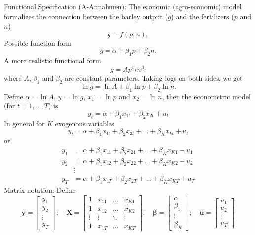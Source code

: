\documentclass{article}
\begin{document}
Functional Specification (A-Annahmen):  
The economic (agro-economic) model formalizes the connection between the barley output ($g$) and the fertilizers ($p$ and $n$)
\[ g=f(p,n), \]
Possible function form
\[ g=\alpha +\beta _{1}p+\beta _{2}n. \]
A more realistic functional form
\[ g=Ap^{\beta _{1}}n^{\beta _{2}} \]
where $A$, $\beta _{1}$ and $\beta _{2}$ are constant parameters. Taking logs on both sides, we get
\[ \ln g=\ln A+\beta _{1}\ln p+\beta _{2}\ln n. \]
Define $\alpha =\ln A$, $y=\ln g$, $x_{1}=\ln p$ and $x_{2}=\ln n$, then the econometric model (for $t=1,\ldots ,T$) is
\[ y_{t}=\alpha +\beta _{1}x_{1t}+\beta _{2}x_{2t}+u_{t} \]
In general for $K$ exogenous variables
\[ y_{t}=\alpha +\beta _{1}x_{1t}+\beta _{2}x_{2t}+\ldots +\beta_{K}x_{kt}+u_{t} \]
or
\begin{align*}
y_{1} &=\alpha +\beta _{1}x_{11}+\beta _{2}x_{21}+...+\beta _{K}x_{K1}+u_{1} \\
y_{2} &=\alpha +\beta _{1}x_{12}+\beta _{2}x_{22}+...+\beta _{K}x_{K2}+u_{2} \\
&\vdots \\
y_{T} &=\alpha +\beta _{1}x_{1T}+\beta _{2}x_{2T}+...+\beta _{K}x_{KT}+u_{T}
\end{align*}
Matrix notation: Define
\begin{equation*}
\mathbf{y}=\left[ 
\begin{array}{l}
y_{1} \\ 
y_{2} \\ 
\vdots \\ 
y_{T}%
\end{array}%
\right] ;\quad \mathbf{X}=\left[ 
\begin{array}{llll}
1 & x_{11} & \ldots & x_{K1} \\ 
1 & x_{12} & \ldots & x_{K2} \\ 
\vdots & \vdots & \ddots & \vdots \\ 
1 & x_{1T} & \ldots & x_{KT}%
\end{array}%
\right] ;\quad \mathbf{\beta }=\left[ 
\begin{array}{l}
\alpha \\ 
\beta _{1} \\ 
\vdots \\ 
\beta _{K}%
\end{array}%
\right] ;\quad \mathbf{u}=\left[ 
\begin{array}{l}
u_{1} \\ 
u_{2} \\ 
\vdots \\ 
u_{T}%
\end{array}%
\right]
\end{equation*}
\end{document}
